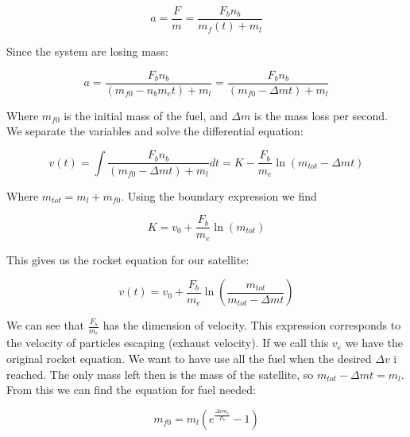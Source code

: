 \documentclass[a4paper, 10pt]{article}
\begin{document}
\begin{equation}
a = \frac{F}{m} = \frac{F_b n_b}{m_f(t) + m_l} 
\end{equation}

Since the system are losing mass:

\begin{equation}
a = \frac{F_b n_b}{(m_{f0} - n_b m_e t) + m_l} = \frac{F_b n_b}{(m_{f0} - \Delta m t) + m_l}
\end{equation} 

Where $m_{f0}$ is the initial mass of the fuel, and $\Delta m$ is the mass loss per second. We separate the variables and solve the differential equation:

\begin{equation}
v(t) = \int \frac{F_b n_b}{(m_{f0} - \Delta m t) + m_l} dt
= K - \frac{F_b}{m_e} \ln(m_{tot} - \Delta m t) 
\end{equation}

Where $m_{tot} = m_l + m_{f0}$. Using the boundary expression we find

\begin{equation}
K = v_0 + \frac{F_b}{m_e} \ln (m_{tot})
\end{equation}

This gives us the rocket equation for our satellite: 

\begin{equation}
v(t) =v_0 + \frac{F_b}{m_e} \ln \left(\frac{m_{tot}}{m_{tot} - \Delta m t} \right)
\end{equation}

We can see that $\frac{F_b}{m_e}$ has the dimension of velocity. This expression corresponds to the velocity of particles escaping (exhaust velocity). If we call this $v_e$ we have the original rocket equation. We want to have use all the fuel when the desired $\Delta v$ i reached. The only mass left then is the mass of the satellite, so $m_{tot} - \Delta m t = m_l$. From this we can find the equation for fuel needed:

\begin{equation}
m_{f0} = m_l(e^{\frac{\Delta v m_e}{F_b}} - 1)
\end{equation}
\end{document}
